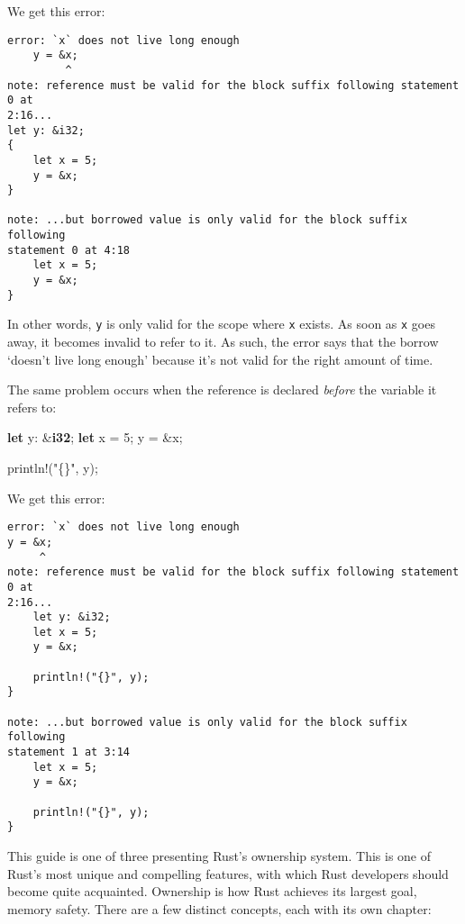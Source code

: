 \documentclass[a4paper,]{book}
\newenvironment{Shaded}{\begin{snugshade}}{\end{snugshade}}
\newcommand{\KeywordTok}[1]{\textcolor[rgb]{0.13,0.29,0.53}{\textbf{{#1}}}}
\newcommand{\DecValTok}[1]{\textcolor[rgb]{0.00,0.00,0.81}{{#1}}}
\newcommand{\StringTok}[1]{\textcolor[rgb]{0.31,0.60,0.02}{{#1}}}
\newcommand{\OtherTok}[1]{\textcolor[rgb]{0.56,0.35,0.01}{{#1}}}
\newcommand{\NormalTok}[1]{{#1}}
\begin{document}
We get this error:

\begin{verbatim}
error: `x` does not live long enough
    y = &x;
         ^
note: reference must be valid for the block suffix following statement 0 at
2:16...
let y: &i32;
{ 
    let x = 5;
    y = &x;
}

note: ...but borrowed value is only valid for the block suffix following
statement 0 at 4:18
    let x = 5;
    y = &x;
}
\end{verbatim}

In other words, \texttt{y} is only valid for the scope where \texttt{x}
exists. As soon as \texttt{x} goes away, it becomes invalid to refer to
it. As such, the error says that the borrow `doesn't live long enough'
because it's not valid for the right amount of time.

The same problem occurs when the reference is declared \emph{before} the
variable it refers to:

\begin{Shaded}
\begin{Highlighting}[]
\KeywordTok{let} \NormalTok{y: &}\KeywordTok{i32}\NormalTok{;}
\KeywordTok{let} \NormalTok{x = }\DecValTok{5}\NormalTok{;}
\NormalTok{y = &x;}

\OtherTok{println!}\NormalTok{(}\StringTok{"\{\}"}\NormalTok{, y);}
\end{Highlighting}
\end{Shaded}

We get this error:

\begin{verbatim}
error: `x` does not live long enough
y = &x;
     ^
note: reference must be valid for the block suffix following statement 0 at
2:16...
    let y: &i32;
    let x = 5;
    y = &x;
    
    println!("{}", y);
}

note: ...but borrowed value is only valid for the block suffix following
statement 1 at 3:14
    let x = 5;
    y = &x;
    
    println!("{}", y);
}
\end{verbatim}


This guide is one of three presenting Rust's ownership system. This is
one of Rust's most unique and compelling features, with which Rust
developers should become quite acquainted. Ownership is how Rust
achieves its largest goal, memory safety. There are a few distinct
concepts, each with its own chapter:
\end{document}
